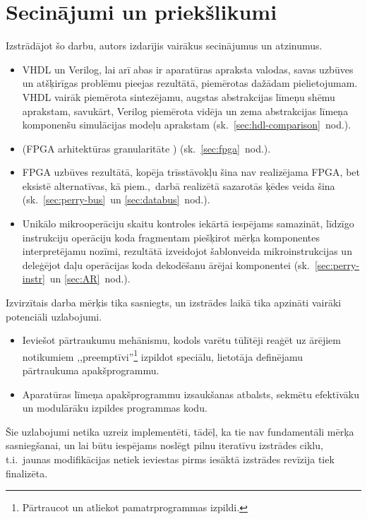 \section*{Secinājumi un priekšlikumi}%
Izstrādājot šo darbu, autors izdarījis vairākus secinājumus un atzinumus.
\begin{itemize}
	\item VHDL un Verilog, lai arī abas ir aparatūras apraksta valodas,
		savas uzbūves un atšķirīgas problēmu pieejas rezultātā, piemērotas
		dažādam pielietojumam. VHDL vairāk piemērota sintezējamu, augstas
		abstrakcijas līmeņu shēmu aprakstam, savukārt, Verilog piemērota
		vidēja un zema abstrakcijas līmeņa komponenšu 
		simulācijas modeļu aprakstam (sk.~\ref{sec:hdl-comparison}~nod.).
	\item (FPGA arhitektūras granularitāte \todo ) 
		(sk.~\ref{sec:fpga}~nod.).
	\item FPGA uzbūves rezultātā, kopēja trīsstāvokļu šina nav realizējama
		FPGA, bet eksistē alternatīvas, kā piem.,~darbā realizētā sazarotās
		ķēdes veida šina (sk.~\ref{sec:perry-bus}~un \ref{sec:databus}~nod.).
	\item Unikālo mikrooperāciju skaitu kontroles iekārtā iespējams samazināt,
		līdzīgo instrukciju operāciju koda fragmentam piešķirot
		mērķa komponentes interpretējamu nozīmi, rezultātā izveidojot šablonveida
		mikroinstrukcijas un deleģējot daļu operācijas koda dekodēšanu ārējai
		komponentei (sk.~\ref{sec:perry-instr}~un \ref{sec:AR}~nod.).
\end{itemize}

Izvirzītais darba mērķis tika sasniegts, un izstrādes laikā tika apzināti
vairāki potenciāli uzlabojumi.
\begin{itemize}
	\item Ieviešot pārtraukumu mehānismu, kodols varētu tūlītēji reaģēt
		uz ārējiem notikumiem ,,preemptīvi''\footnote{%
			Pārtraucot un atliekot pamatrprogrammas izpildi.}
		izpildot speciālu, lietotāja definējamu pārtraukuma apakšprogrammu.
	\item Aparatūras līmeņa apakšprogrammu izsaukšanas atbalsts,
		sekmētu efektīvāku un modulārāku izpildes programmas kodu.
\end{itemize}
Šie uzlabojumi netika uzreiz implementēti,
tādēļ, ka tie nav fundamentāli mērķa sasniegšanai, un lai būtu iespējams 
noslēgt pilnu iteratīvu izstrādes ciklu, t.i.~jaunas modifikācijas netiek
ieviestas pirms iesāktā izstrādes revīzija tiek finalizēta.




